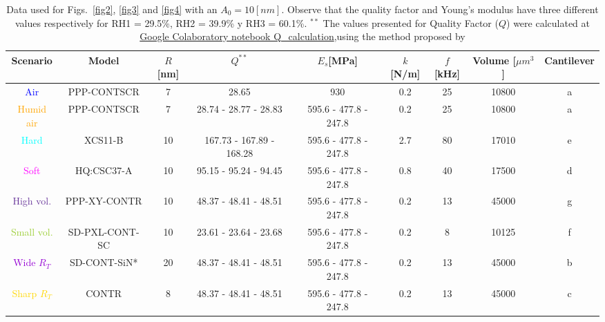 \documentclass[letterpaper,compsoc,twoside]{IEEEtran}
\begin{document}
\renewcommand{\tablename}{Tabla}
\begin{table}[ht]
\caption{Data used for Figs.~\ref{fig2}, \ref{fig3} and \ref{fig4} with an $A_0 = 10 [nm]$. Observe that the quality factor and Young's modulus have three different values respectively for RH1 = 29.5\%, RH2 = 39.9\% y RH3 = 60.1\%. $^{**}$ The values presented for Quality Factor ($Q$) were calculated at  \href{https://colab.research.google.com/drive/1O1xjLfmMoL6J4EwVods95zfelzr8GDUQ?usp=sharing}{Google Colaboratory notebook Q\_calculation},using the method proposed by \cite{Sader, Sader2}}
\centering
\begin{tabular}{ c  c  c  c  c  c  c  c  c }
\hline
Scenario  & Model & $R$[nm] & $Q^{**}$ & $E_s$[MPa] & $k$[N/m] & $f$[kHz] & Volume [$\mu m^3$] & Cantilever\\ \hline
\textcolor{blue}{Air} & PPP-CONTSCR & 7 & 28.65 & 930 & 0.2 & 25 & 10800 & a\\
\textcolor{orange}{Humid air}& PPP-CONTSCR & 7 & 28.74 - 28.77 - 28.83 & 595.6 - 477.8 - 247.8 & 0.2 & 25 & 10800 &a \\
\textcolor{cyan}{Hard} & XCS11-B & 10 & 167.73 - 167.89 - 168.28 & 595.6 - 477.8 - 247.8 & 2.7 & 80 & 17010 & e \\
\textcolor{magenta}{Soft} & HQ:CSC37-A & 10 & 95.15 - 95.24 - 94.45 & 595.6 - 477.8 - 247.8 & 0.8 & 40 & 17500 & d \\
\textcolor{rebeccapurple}{High vol.} & PPP-XY-CONTR & 10 & 48.37 - 48.41 - 48.51 & 595.6 - 477.8 - 247.8 & 0.2 & 13 & 45000 & g \\
\textcolor{yellowgreen}{Small vol.} & SD-PXL-CONT-SC & 10 & 23.61 - 23.64 - 23.68 & 595.6 - 477.8 - 247.8 & 0.2 & 8 & 10125 & f \\
\textcolor{darkviolet}{Wide $R_T$} & SD-CONT-SiN* & 20 & 48.37 - 48.41 - 48.51 & 595.6 - 477.8 - 247.8 & 0.2 & 13 & 45000 & b \\
\textcolor{gold}{Sharp $R_T$} & CONTR & 8 & 48.37 - 48.41 - 48.51 & 595.6 - 477.8 - 247.8 & 0.2 & 13 & 45000 & c \\ \hline
\end{tabular}
\label{tab:compare}
\end{table}
\end{document}
